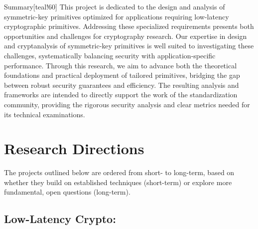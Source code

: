 \begin{genericbox}{Summary}[teal!60]
This project is dedicated to the design and analysis of symmetric-key primitives optimized for applications requiring low-latency cryptographic primitives.
Addressing these specialized requirements presents both opportunities and challenges for cryptography research.
Our expertise in design and cryptanalysis of symmetric-key primitives is well suited to investigating these challenges, systematically balancing security with application-specific performance.
Through this research, we aim to advance both the theoretical foundations and practical deployment of tailored primitives, bridging the gap between robust security guarantees and efficiency.
The resulting analysis and frameworks are intended to directly support the work of the standardization community, providing the rigorous security analysis and clear metrics needed for its technical examinations.
\end{genericbox}

\section{Research Directions}
The projects outlined below are ordered from short- to long-term, based on whether they build on established techniques (short-term) or explore more fundamental, open questions (long-term).

\subsection{Low-Latency Crypto:}
